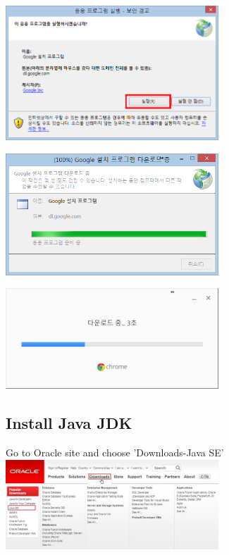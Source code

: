 \documentclass[12pt]{article}
\begin{document}
\begin{center}
\includegraphics[width=80mm,scale=1.3]{chrome2}
\end{center}

\begin{center}
\includegraphics[width=80mm,scale=1.3]{chrome3}
\end{center}

\begin{center}
\includegraphics[width=80mm,scale=1.3]{chrome4}
\end{center}


\subsection{Install Java JDK}
\begin{center}
Go to Oracle site and choose 'Downloads-Java SE'\\ [1\baselineskip]
\includegraphics[width=80mm,scale=1.3]{jdk1}
\end{center}
\end{document}

